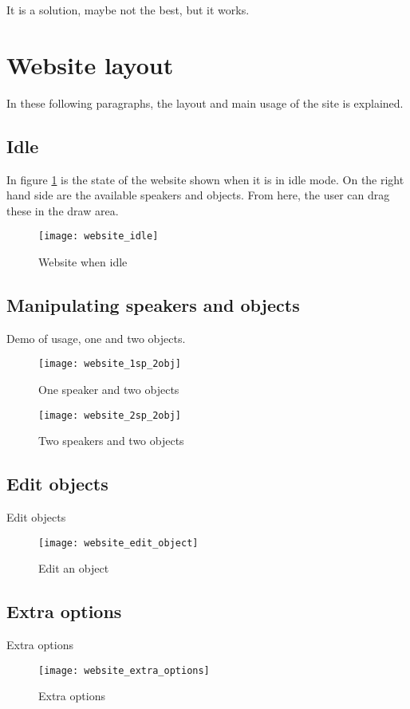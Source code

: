 It is a solution, maybe not the best, but it works.

\section{Website layout}
In these following paragraphs, the layout and main usage of the site is explained.

\subsection{Idle}
In figure \ref{fig:website_idle} is the state of the website shown when it is in idle mode.
On the right hand side are the available speakers and objects. From here, the user can drag these in the draw area.

\begin{figure}[H]
    \centering
    \texttt{[image: website\_idle]}
    \caption{Website when idle}
    \label{fig:website_idle}
\end{figure}

\subsection{Manipulating speakers and objects}

Demo of usage, one and two objects.
\begin{figure}[H]
    \centering
        \begin{minipage}[b]{0.5\textwidth}
            \centering
            \texttt{[image: website\_1sp\_2obj]}
            \caption{One speaker and two objects}
            \label{fig:website_1sp_2obj}
        \end{minipage}%
        \begin{minipage}[b]{0.5\textwidth}
            \centering
            \texttt{[image: website\_2sp\_2obj]}
            \caption{Two speakers and two objects}
            \label{fig:website_2sp_2obj}
    \end{minipage}
\end{figure}

\subsection{Edit objects}

Edit objects
\begin{figure}[H]
    \centering
    \texttt{[image: website\_edit\_object]}
    \caption{Edit an object}
    \label{fig:website_edit_object}
\end{figure}

\subsection{Extra options}
Extra options

\begin{figure}[H]
    \centering
    \texttt{[image: website\_extra\_options]}
    \caption{Extra options}
    \label{fig:website_extra_options}
\end{figure}
